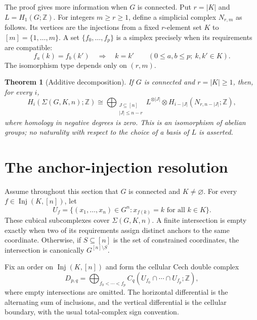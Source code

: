 \documentclass[11pt]{article}
\newtheorem{theorem}{Theorem}
\newcommand{\Z}{\mathbb Z}
\newcommand{\inj}{\operatorname{Inj}}
\begin{document}
The proof gives more information when $G$ is connected.  Put $r=|K|$ and $L=H_1(G;\Z)$.  For integers $m\geq r\geq1$, define a simplicial complex $N_{r,m}$ as follows.  Its vertices are the injections from a fixed $r$-element set $K$ to $[m]=\{1,\ldots,m\}$.  A set $\{f_0,\ldots,f_p\}$ is a simplex precisely when its requirements are compatible:
\begin{equation}\label{eq:compatibility}
 f_a(k)=f_b(k')\quad\Longrightarrow\quad k=k'
 \qquad(0\leq a,b\leq p;\ k,k'\in K).
\end{equation}
The isomorphism type depends only on $(r,m)$.

\begin{theorem}[Additive decomposition]\label{thm:decomposition}
If $G$ is connected and $r=|K|\geq1$, then, for every $i$,
\begin{equation}\label{eq:decomposition}
 H_i(\Sigma(G,K,n);\Z)\cong
 \bigoplus_{\substack{J\subseteq[n]\\ |J|\leq n-r}}
 L^{\otimes |J|}\otimes
 H_{i-|J|}(N_{r,n-|J|};\Z),
\end{equation}
where homology in negative degrees is zero.  This is an isomorphism of abelian groups; no naturality with respect to the choice of a basis of $L$ is asserted.
\end{theorem}

\section{The anchor-injection resolution}

Assume throughout this section that $G$ is connected and $K\neq\varnothing$.  For every $f\in\inj(K,[n])$, let
\[
 U_f=\{(x_1,\ldots,x_n)\in G^n:x_{f(k)}=k\text{ for all }k\in K\}.
\]
These cubical subcomplexes cover $\Sigma(G,K,n)$.  A finite intersection is empty exactly when two of its requirements assign distinct anchors to the same coordinate.  Otherwise, if $S\subseteq[n]$ is the set of constrained coordinates, the intersection is canonically $G^{[n]\setminus S}$.

Fix an order on $\inj(K,[n])$ and form the cellular Cech double complex
\begin{equation}\label{eq:cech}
 D_{p,q}=\bigoplus_{f_0<\cdots<f_p}
 C_q(U_{f_0}\cap\cdots\cap U_{f_p};\Z),
\end{equation}
where empty intersections are omitted.  The horizontal differential is the alternating sum of inclusions, and the vertical differential is the cellular boundary, with the usual total-complex sign convention.
\end{document}
